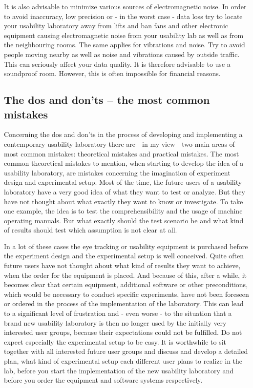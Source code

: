 \documentclass[output=paper]{langsci/langscibook}
\begin{document}
It is also advisable to minimize various sources of electromagnetic noise. In order to avoid inaccuracy, low precision or - in the worst case - data loss try to locate your usability laboratory away from lifts and ban fans and other electronic equipment causing electromagnetic noise from your usability lab as well as from the neighbouring rooms. The same applies for vibrations and noise. Try to avoid people moving nearby as well as noise and vibrations caused by outside traffic. This can seriously affect your data quality. It is therefore advisable to use a soundproof room. However, this is often impossible for financial reasons.


\subsection{The dos and don'ts – the most common mistakes }

Concerning the dos and don'ts in the process of developing and implementing a contemporary usability laboratory there are - in my view - two main areas of most common mistakes: theoretical mistakes and practical mistakes. The most common theoretical mistakes to mention, when starting to develop the idea of a usability laboratory, are mistakes concerning the imagination of experiment design and experimental setup. Most of the time, the future users of a usability laboratory have a very good idea of what they want to test or analyze. But they have not thought about what exactly they want to know or investigate. To take one example, the idea is to test the comprehensibility and the usage of machine operating manuals. But what exactly should the test scenario be and what kind of results should test which assumption is not clear at all. 


In a lot of these cases the eye tracking or usability equipment is purchased before the experiment design and the experimental setup is well conceived. Quite often future users have not thought about what kind of results they want to achieve, when the order for the equipment is placed. And because of this, after a while, it becomes clear that certain equipment, additional software or other preconditions, which would be necessary to conduct specific experiments, have not been foreseen or ordered in the process of the implementation of the laboratory. This can lead to a significant level of frustration and - even worse - to the situation that a brand new usability laboratory is then no longer used by the initially very interested user groups, because their expectations could not be fulfilled. Do not expect especially the experimental setup to be easy. It is worthwhile to sit together with all interested future user groups and discuss and develop a detailed plan, what kind of experimental setup each different user plans to realize in the lab, before you start the implementation of the new usability laboratory and before you order the equipment and software systems respectively.
\end{document}
